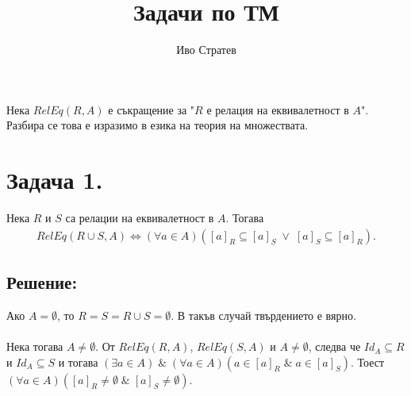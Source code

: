 \documentclass[12pt]{article}
\title{Задачи по ТМ}
\author{Иво Стратев}
\begin{document}
\maketitle

Нека \(RelEq(R, A)\) е съкращение за "\(R\) е релация на еквивалетност в \(A\)".
Разбира се това е изразимо в езика на теория на множествата.

\section*{Задача 1.}

Нека \(R\) и \(S\) са релации на еквивалетност в \(A\).
Тогава
\begin{align*}
RelEq(R \cup S, A) \iff (\forall a \in A)([a]_R \subseteq [a]_S \; \lor \; [a]_S \subseteq [a]_R).
\end{align*}
\subsection*{Решение:}
Ако \(A = \emptyset\), то \(R = S = R \cup S = \emptyset\).
В такъв случай твърдението е вярно.
\\
\vspace{5mm}
\\
Нека тогава \(A \neq \emptyset\).
От \(RelEq(R, A)\), \(RelEq(S, A)\) и \(A \neq \emptyset\),
следва че \(Id_A \subseteq R\) и \(Id_A \subseteq S\) и тогава
\((\exists a \in A) \; \& \; (\forall a \in A)(a \in [a]_R \; \& \; a \in [a]_S)\).
Тоест \((\forall a \in A)([a]_R \neq \emptyset \; \& \; [a]_S \neq \emptyset)\).
\end{document}
